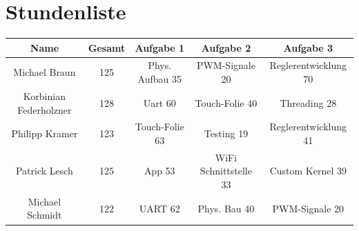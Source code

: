 \documentclass[12pt,a4paper,bibliography=totoc,listof=totoc]{scrartcl}
\begin{document}
\section {Stundenliste}

\begin{table}[htb]
\centering
\begin{tabular}{|c|c|c|c|c|}
\hline
 Name					& Gesamt &Aufgabe 1	&Aufgabe 2	&Aufgabe 3 \\
 \hline
 Michael Braun			&125			&Phys. Aufbau 35			&PWM-Signale 20			&Reglerentwicklung 70			\\
 \hline
 Korbinian Federholzner	&128			&Uart 60			&Touch-Folie 40			&Threading 28			\\
 \hline
 Philipp Kramer			&123			&Touch-Folie 63			&Testing 19		&Reglerentwicklung 41			\\
 \hline
 Patrick Lesch			&125			&App 53 			&WiFi Schnittstelle	33		&Custom Kernel 39  			\\
 \hline
 Michael Schmidt		&122			&UART 62			& Phys. Bau 40			&PWM-Signale 20			\\
  \hline
\end{tabular}
\label{tab:stundenliste}
\end{table}
\end{document}
